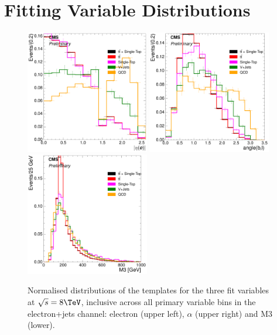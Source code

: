 \section{Fitting Variable Distributions}
\label{as:fitting_variables_distributions}
\begin{figure}[hbtp]
    \centering
     \includegraphics[width=0.48\textwidth]{Chapters/04_Analysis/04b_XSections/images/8TeV/fit_variables/electron/MET/electron_absolute_eta/MET_inclusive_electron_absolute_eta_2orMoreBtags_templates.pdf}\hfill
     \includegraphics[width=0.48\textwidth]{Chapters/04_Analysis/04b_XSections/images/8TeV/fit_variables/electron/MET/angle_bl/MET_inclusive_angle_bl_2orMoreBtags_templates.pdf}
     \includegraphics[width=0.48\textwidth]{Chapters/04_Analysis/04b_XSections/images/8TeV/fit_variables/electron/MET/M3/MET_inclusive_M3_2orMoreBtags_templates.pdf}\\
	 \caption{Normalised distributions of the templates for the three fit variables at $\sqrt{s}=8\TeV$,
	 inclusive across all primary variable bins in the electron+jets channel: electron \abseta (upper left),
	 $\alpha$ (upper right) and M3 (lower).}
     \label{fig:fit_variable_distributions_electron_8TeV}
\end{figure}

